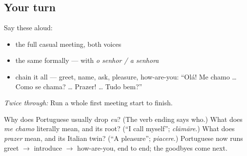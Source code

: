 \subsection*{Your turn}
Say these aloud:

\begin{itemize}
\raggedright
  \item the full casual meeting, both voices
  \item the same formally — with \emph{o senhor / a senhora}
  \item chain it all — greet, name, ask, pleasure, how-are-you: \textquotedblleft{}Olá! Me chamo … Como se chama? … Prazer! … Tudo bem?\textquotedblright{}
\end{itemize}

\emph{Twice through:} Run a whole first meeting start to finish.

\begin{tcolorbox}[breakable,colback=teal!4,colframe=teal!35!black,title={Before you move on}]
Why does Portuguese usually drop \emph{eu}? (The verb ending says who.) What does \emph{me chamo} literally mean, and its root? (\textquotedblleft{}I call myself\textquotedblright{}; \emph{clāmāre}.) What does \emph{prazer} mean, and its Italian twin? (\textquotedblleft{}A pleasure\textquotedblright{}; \emph{piacere}.) Portuguese now runs greet $\to$ introduce $\to$ how-are-you, end to end; the goodbyes come next.
\end{tcolorbox}
